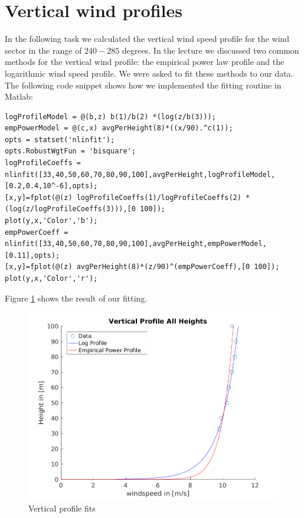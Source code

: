 \documentclass[10pt]{article}
\begin{document}
\section{Vertical wind profiles}
In the following task we calculated the vertical wind speed profile for the wind sector in the range of $240 - 285$ degrees. In the lecture we discussed two common methods for the vertical wind profile: the empirical power law profile and the logarithmic wind speed profile. We were asked to fit these methods to our data. The following code snippet shows how we implemented the fitting routine in Matlab:

\begin{lstlisting}
logProfileModel = @(b,z) b(1)/b(2) *(log(z/b(3)));
empPowerModel = @(c,x) avgPerHeight(8)*((x/90).^c(1));
opts = statset('nlinfit');
opts.RobustWgtFun = 'bisquare';
logProfileCoeffs = nlinfit([33,40,50,60,70,80,90,100],avgPerHeight,logProfileModel,[0.2,0.4,10^-6],opts);
[x,y]=fplot(@(z) logProfileCoeffs(1)/logProfileCoeffs(2) *(log(z/logProfileCoeffs(3))),[0 100]);
plot(y,x,'Color','b');
empPowerCoeff = nlinfit([33,40,50,60,70,80,90,100],avgPerHeight,empPowerModel,[0.11],opts);
[x,y]=fplot(@(z) avgPerHeight(8)*(z/90)^(empPowerCoeff),[0 100]);
plot(y,x,'Color','r');
\end{lstlisting}

Figure \ref{fig:verticalfit} shows the result of our fitting.

\begin{figure}[H]
\centering
\includegraphics[width=0.7\linewidth]{../figures/verticalProfileFits.png}
\caption{Vertical profile fits}
\label{fig:verticalfit}
\end{figure}
\end{document}
